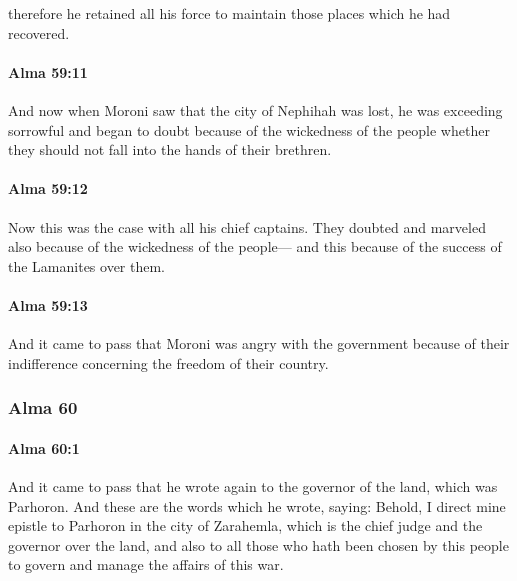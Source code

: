 			therefore he retained all his force
			to maintain those places which he had recovered.

		\paragraph{Alma 59:11} %
			\label{ALMA-59-11}

			And now when Moroni saw that the city of Nephihah was lost,
			he was exceeding sorrowful
			and began to doubt because of the wickedness of the people
			whether they should not fall into the hands of their brethren.

		\paragraph{Alma 59:12} %
			\label{ALMA-59-12}

			Now this was the case with all his chief captains.
			They doubted and marveled also because of the wickedness of the people---
			and this because of the success of the Lamanites over them.

		\paragraph{Alma 59:13} %
			\label{ALMA-59-13}

			And it came to pass that Moroni was angry with the government
			because of their indifference concerning the freedom of their country.

	\subsubsection{Alma 60} %
		\label{ALMA-60}
		
		\paragraph{Alma 60:1} %
			\label{ALMA-60-1}

			And it came to pass that he wrote again
			to the governor of the land, which was Parhoron.
			And these are the words which he wrote, saying:
			Behold, I direct mine epistle to Parhoron in the city of Zarahemla,
			which is the chief judge and the governor over the land,
			and also to all those who hath been chosen by this people
			to govern and manage the affairs of this war.

